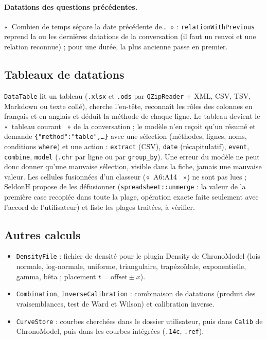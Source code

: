 \documentclass[11pt,a4paper]{article}
\providecommand{\og}{«~}\providecommand{\fg}{\unskip~»}
\newcommand{\code}[1]{\texttt{\small #1}}
\begin{document}
\paragraph{Datations des questions précédentes.} \og Combien de temps sépare la date précédente de\dots \fg{} :
\code{relationWithPrevious} reprend la ou les dernières datations de la conversation (il faut un renvoi et une
relation reconnue) ; pour une durée, la plus ancienne passe en premier.

\subsection{Tableaux de datations}\label{sec:tableaux}
\code{DataTable} lit un tableau (\code{.xlsx} et \code{.ods} par \code{QZipReader} + XML, CSV, TSV, Markdown ou
texte collé), cherche l'en-tête, reconnaît les rôles des colonnes en français et en anglais et déduit la méthode de
chaque ligne. Le tableau devient le \og tableau courant \fg{} de la conversation ; le modèle n'en reçoit qu'un résumé
et demande \code{\{"method":"table",…\}} avec une sélection (méthodes, lignes, noms, conditions \code{where}) et une
action : \code{extract} (CSV), \code{date} (récapitulatif), \code{event}, \code{combine}, \code{model} (\code{.chr} par
ligne ou par \code{group\_by}). Une erreur du modèle ne peut donc donner qu'une mauvaise sélection, visible dans la
fiche, jamais une mauvaise valeur. Les cellules fusionnées d'un classeur (\og A6:A14 \fg) ne sont pas lues ; SeldonH
propose de les défusionner (\code{spreadsheet::unmerge} : la valeur de la première case recopiée dans toute la plage,
opération exacte faite seulement avec l'accord de l'utilisateur) et liste les plages traitées, à vérifier.

\subsection{Autres calculs}
\begin{itemize}[leftmargin=*]
\item \code{DensityFile} : fichier de densité pour le plugin Density de ChronoModel (lois normale, log-normale,
  uniforme, triangulaire, trapézoïdale, exponentielle, gamma, bêta ; placement $t = \text{offset} \pm x$).
\item \code{Combination}, \code{InverseCalibration} : combinaison de datations (produit des vraisemblances, test de
  Ward et Wilson) et calibration inverse.
\item \code{CurveStore} : courbes cherchées dans le dossier utilisateur, puis dans \code{Calib} de ChronoModel, puis
  dans les courbes intégrées (\code{.14c}, \code{.ref}).
\end{itemize}
\end{document}

